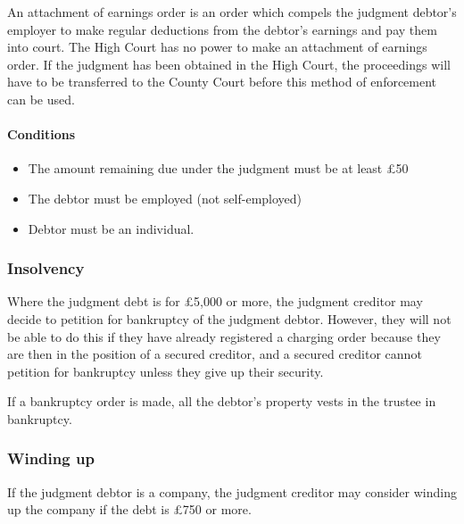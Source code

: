 \documentclass[
]{article}
\providecommand{\tightlist}{%
  \setlength{\itemsep}{0pt}\setlength{\parskip}{0pt}}
\begin{document}
An attachment of earnings order is an order which compels the judgment
debtor's employer to make regular deductions from the debtor's earnings
and pay them into court. The High Court has no power to make an
attachment of earnings order. If the judgment has been obtained in the
High Court, the proceedings will have to be transferred to the County
Court before this method of enforcement can be used.

\hypertarget{conditions}{%
\paragraph{Conditions}\label{conditions}}

\begin{itemize}
\tightlist
\item
  The amount remaining due under the judgment must be at least £50
\item
  The debtor must be employed (not self-employed)
\item
  Debtor must be an individual.
\end{itemize}

\hypertarget{insolvency}{%
\subsubsection{Insolvency}\label{insolvency}}

Where the judgment debt is for £5,000 or more, the judgment creditor may
decide to petition for bankruptcy of the judgment debtor. However, they
will not be able to do this if they have already registered a charging
order because they are then in the position of a secured creditor, and a
secured creditor cannot petition for bankruptcy unless they give up
their security.

If a bankruptcy order is made, all the debtor's property vests in the
trustee in bankruptcy.

\hypertarget{winding-up}{%
\subsubsection{Winding up}\label{winding-up}}

If the judgment debtor is a company, the judgment creditor may consider
winding up the company if the debt is £750 or more.
\end{document}
